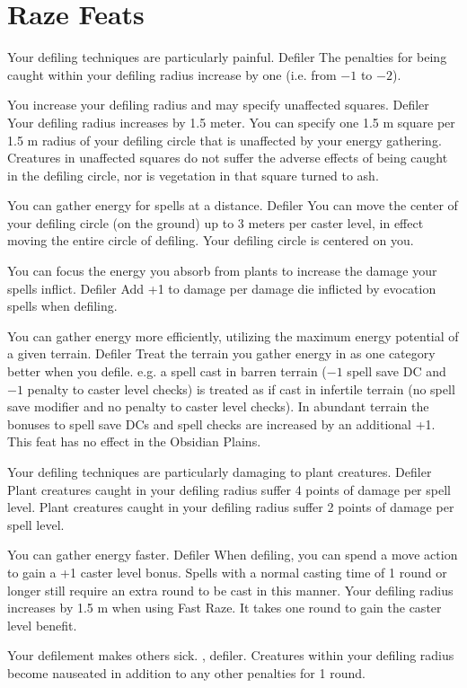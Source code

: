 \section{Raze Feats}

{Your defiling techniques are particularly painful.}
{Defiler}
{The penalties for being caught within your defiling radius increase by one (i.e. from $-1$ to $-2$).}
{}{}

{You increase your defiling radius and may specify unaffected squares.}
{Defiler}
{Your defiling radius increases by 1.5 meter. You can specify one 1.5 m square per 1.5 m radius of your defiling circle that is unaffected by your energy gathering. Creatures in unaffected squares do not suffer the adverse effects of being caught in the defiling circle, nor is vegetation in that square turned to ash.}
{}{}

{You can gather energy for spells at a distance.}
{Defiler}
{You can move the center of your defiling circle (on the ground) up to 3 meters per caster level, in effect moving the entire circle of defiling.}
{Your defiling circle is centered on you.}
{}

{You can focus the energy you absorb from plants to increase the damage your spells inflict.}
{Defiler}
{Add +1 to damage per damage die inflicted by evocation spells when defiling.}
{}{}

{You can gather energy more efficiently, utilizing the maximum energy potential of a given terrain.}
{Defiler}
{Treat the terrain you gather energy in as one category better when you defile. e.g. a spell cast in barren terrain ($-1$ spell save DC and $-1$ penalty to caster level checks) is treated as if cast in infertile terrain (no spell save modifier and no penalty to caster level checks). In abundant terrain the bonuses to spell save DCs and spell checks are increased by an additional +1. This feat has no effect in the Obsidian Plains.}
{}{}

{Your defiling techniques are particularly damaging to plant creatures.}
{Defiler}
{Plant creatures caught in your defiling radius suffer 4 points of damage per spell level.}
{Plant creatures caught in your defiling radius suffer 2 points of damage per spell level.}
{}

{You can gather energy faster.}
{Defiler}
{When defiling, you can spend a move action to gain a +1 caster level bonus. Spells with a normal casting time of 1 round or longer still require an extra round to be cast in this manner. Your defiling radius increases by 1.5 m when using Fast Raze.}
{It takes one round to gain the caster level benefit.}
{}

{Your defilement makes others sick.}
{, defiler.}
{Creatures within your defiling radius become nauseated in addition to any other penalties for 1 round.}
{}{}